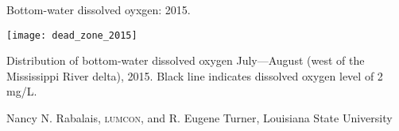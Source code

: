 \documentclass[t]{beamer}
\begin{document}
%
%
%	
%	
%
%
%
%
%	
%	
%
%
%
\begin{frame}{Bottom-water dissolved oyxgen: 2015.}

	\texttt{[image: dead\_zone\_2015]}

	Distribution of bottom-water dissolved oxygen July—August (west of the Mississippi River delta), 2015. Black line indicates dissolved oxygen level of 2 mg/L.
	
	\vfilll
	
	\hfill \tiny Nancy N. Rabalais, \textsc{lumcon}, and R. Eugene Turner, Louisiana State University

\end{frame}
%
\end{document}
